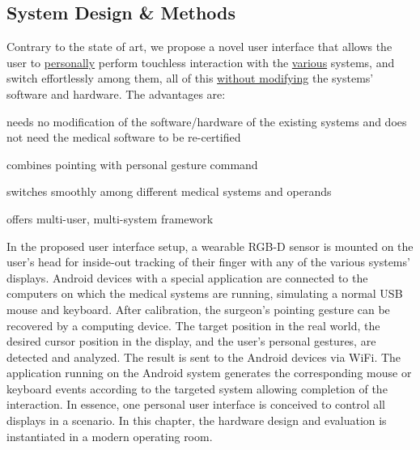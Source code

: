 \subsection{System Design \& Methods}
Contrary to the state of art, we propose a novel user interface that allows the user to \underline{personally} perform touchless interaction with the \underline{various}  systems, and switch effortlessly among them, all of this \underline{without modifying} the systems' software and hardware. The advantages are: 
\begin{description} [font=$\bullet$\scshape\bfseries]
	\item needs no modification of the software/hardware of the existing systems and does not need the medical software to be re-certified
	\item combines pointing with personal gesture command
	\item switches smoothly among different medical systems and operands
	\item offers multi-user, multi-system framework
\end{description}
In the proposed user interface setup, a wearable RGB-D sensor is mounted on the user's head for inside-out tracking of their finger with any of the various systems' displays. Android devices with a special application are connected to the computers on which the medical systems are running, simulating a normal USB mouse and keyboard. 
After calibration, the surgeon's pointing gesture can be recovered by a computing device. The target position in the real world, the desired cursor position in the display, and the user's personal gestures, are detected and analyzed. The result is sent to the Android devices via WiFi. The application running on the Android system generates the corresponding mouse or keyboard events according to the targeted system allowing completion of the interaction. In essence, one personal user interface is conceived to control all displays in a scenario. In this chapter, the hardware design and evaluation is instantiated in a modern operating room. 

